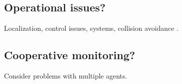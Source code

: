 \subsection{Operational issues?}
Localization, control issues, systems, collision avoidance .

\subsection{Cooperative monitoring?}
Consider problems with multiple agents.
